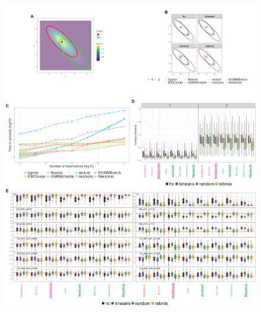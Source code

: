 \begin{figure}

{\centering \includegraphics[width=0.6\linewidth]{figs/bivariate/multivariate_unbalanced_overlapping_negatively_correlated} 

}


\end{figure}
